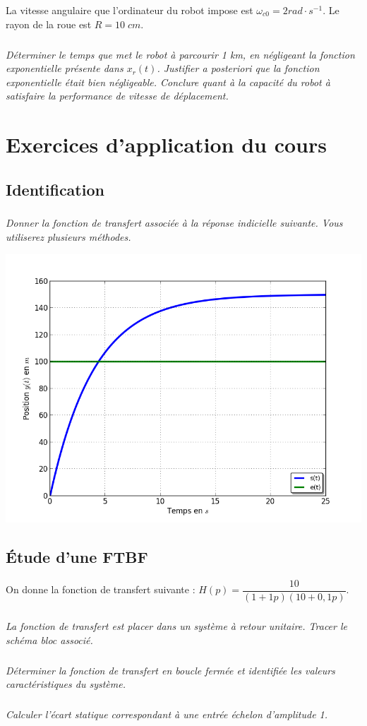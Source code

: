 \documentclass[10pt,fleqn]{article} %
\begin{document}
\begin{multicols}{2}
La vitesse angulaire que l'ordinateur du robot impose est $\omega_{c0}=2 rad\cdot s^{-1}$. Le rayon de la roue est $R=10\;cm$.  

\subparagraph{}
\textit{Déterminer le temps que met le robot à parcourir 1 km, en négligeant la fonction exponentielle présente dans $x_r (t)$. Justifier a posteriori que la fonction exponentielle était bien négligeable. Conclure quant à la capacité du robot à satisfaire la performance de vitesse de déplacement.}

\section*{Exercices d'application du cours}
\subsection*{Identification}
\subparagraph*{}\textit{Donner la fonction de transfert associée à la réponse indicielle suivante. Vous utiliserez plusieurs méthodes.}

\begin{center}
\includegraphics[width=\linewidth]{images/courbe2}
\end{center} 


\subsection*{Étude d'une FTBF}
\setcounter{exo}{0}
On donne la fonction de transfert suivante : $H(p)=\dfrac{10}{\left(1+1p \right)\left(10+0,1 p \right)}$. 
\subparagraph{}
\textit{La fonction de transfert est placer dans un système à retour unitaire. Tracer le schéma bloc associé.}

\subparagraph{}
\textit{Déterminer la fonction de transfert en boucle fermée et identifiée les valeurs caractéristiques du système.}
 
\subparagraph{}
\textit{Calculer l'écart statique correspondant à une entrée échelon d'amplitude 1.}
\end{multicols}
\end{document}
